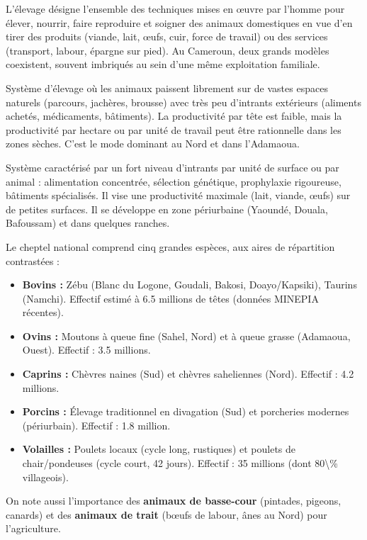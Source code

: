 \documentclass[11pt]{article}
\newcounter{popsec}
\newcounter{popsub}
\newcommand{\courssub}[1]{%
  \stepcounter{popsub}%
  \par\vspace{9pt}\noindent{\popxbold\fontsize{11.5}{13}\selectfont\color{popink}{\color{poporange}\thepopsec.\thepopsub}\hspace{6pt}#1}\par\nopagebreak\vspace{4pt}
}
\begin{document}
\courssub{Généralités et types d'élevage}

L'élevage désigne l'ensemble des techniques mises en œuvre par l'homme pour élever, nourrir, faire reproduire et soigner des animaux domestiques en vue d'en tirer des produits (viande, lait, œufs, cuir, force de travail) ou des services (transport, labour, épargne sur pied). Au Cameroun, deux grands modèles coexistent, souvent imbriqués au sein d'une même exploitation familiale.

\begin{definition}
Système d'élevage où les animaux paissent librement sur de vastes espaces naturels (parcours, jachères, brousse) avec très peu d'intrants extérieurs (aliments achetés, médicaments, bâtiments). La productivité par tête est faible, mais la productivité par hectare ou par unité de travail peut être rationnelle dans les zones sèches. C'est le mode dominant au Nord et dans l'Adamaoua.
\end{definition}

\begin{definition}
Système caractérisé par un fort niveau d'intrants par unité de surface ou par animal : alimentation concentrée, sélection génétique, prophylaxie rigoureuse, bâtiments spécialisés. Il vise une productivité maximale (lait, viande, œufs) sur de petites surfaces. Il se développe en zone périurbaine (Yaoundé, Douala, Bafoussam) et dans quelques ranches.
\end{definition}

Le cheptel national comprend cinq grandes espèces, aux aires de répartition contrastées :
\begin{itemize}
    \item \textbf{Bovins :} Zébu (Blanc du Logone, Goudali, Bakosi, Doayo/Kapsiki), Taurins (Namchi). Effectif estimé à \num{6,5} millions de têtes (données MINEPIA récentes).
    \item \textbf{Ovins :} Moutons à queue fine (Sahel, Nord) et à queue grasse (Adamaoua, Ouest). Effectif : \num{3,5} millions.
    \item \textbf{Caprins :} Chèvres naines (Sud) et chèvres saheliennes (Nord). Effectif : \num{4,2} millions.
    \item \textbf{Porcins :} Élevage traditionnel en divagation (Sud) et porcheries modernes (périurbain). Effectif : \num{1,8} million.
    \item \textbf{Volailles :} Poulets locaux (cycle long, rustiques) et poulets de chair/pondeuses (cycle court, 42 jours). Effectif : \num{35} millions (dont \num{80\%} villageois).
\end{itemize}
On note aussi l'importance des \textbf{animaux de basse-cour} (pintades, pigeons, canards) et des \textbf{animaux de trait} (bœufs de labour, ânes au Nord) pour l'agriculture.
\end{document}

